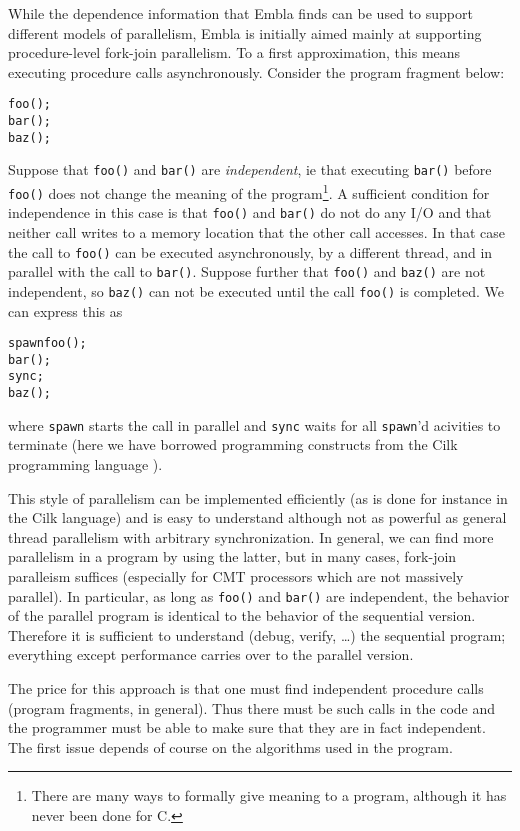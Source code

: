 While the dependence information that Embla finds can be used to 
support different models of parallelism, 
Embla is initially aimed mainly at supporting procedure-level 
fork-join parallelism. To a first approximation, this means executing 
procedure calls asynchronously. Consider the program fragment below:
\begin{alltt}
   foo();
   bar();
   baz();
\end{alltt}
Suppose that {\tt foo()} and {\tt bar()} are {\em independent}, ie that 
executing {\tt bar()} before {\tt foo()} does not change the meaning of
the program\footnote{There are many ways to formally give meaning to a
program, although it has never been done for C.}. A sufficient condition 
for independence
in this case is that {\tt foo()} and {\tt bar()} do not do any I/O and
that neither call writes to a memory location that the other call 
accesses. In that case the call to {\tt foo()} can be executed
asynchronously, 
by a different thread, and in parallel with the call to {\tt bar()}.
Suppose further that {\tt foo()} and {\tt baz()} are not independent,
so {\tt baz()} can not be executed until the call {\tt foo()} is completed.
We can express this as 
\begin{alltt}
   spawn foo();
   bar();
   sync;
   baz();
\end{alltt}
where {\tt spawn} starts the call in parallel and {\tt sync} waits
for all {\tt spawn}'d acivities to terminate (here we have borrowed 
programming constructs from the Cilk programming language 
\cite{BJKLR96,frigo98implementation}).

This style of parallelism can be implemented efficiently (as is done
for instance in the Cilk language) and is easy to understand although
not as powerful as general thread parallelism with arbitrary
synchronization. In general, we can find more parallelism in a program 
by using the latter, but in many cases, fork-join paralleism suffices 
(especially for CMT processors which are not massively parallel).
In particular, as long as {\tt foo()} and {\tt bar()}
are independent, the behavior of the parallel program is identical to
the behavior of the sequential version. Therefore it is sufficient to
understand (debug, verify, \ldots) the sequential program; everything
except performance carries over to the parallel version.

The price for this approach is that one must find independent
procedure calls (program fragments, in general). Thus there must be
such calls in the code and the programmer must be able to make sure
that they are in fact independent. The first issue depends of course
on the algorithms used in the program.

